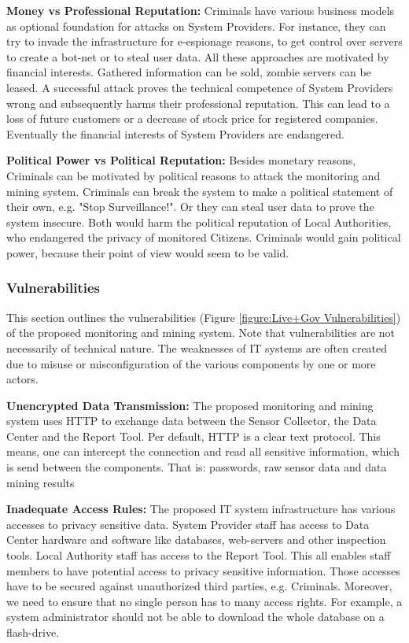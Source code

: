 \textbf{Money vs Professional Reputation:}
Criminals have various business models as optional foundation for attacks on System Providers.
For instance, they can try to invade the infrastructure for e-espionage reasons, to get control over servers to create a bot-net or to steal user data.
All these approaches are motivated by financial interests.
Gathered information can be sold, zombie servers can be leased.
A successful attack proves the technical competence of System Providers wrong and subsequently harms their professional reputation.
This can lead to a loss of future customers or a decrease of stock price for registered companies.
Eventually the financial interests of System Providers are endangered.


\textbf{Political Power vs Political Reputation:}
Besides monetary reasons, Criminals can be motivated by political reasons to attack the monitoring and mining system.
Criminals can break the system to make a political statement of their own, e.g. "Stop Surveillance!".
Or they can steal user data to prove the system insecure.
Both would harm the political reputation of Local Authorities, who endangered the privacy of monitored Citizens.
Criminals would gain political power, because their point of view would seem to be valid.




\subsubsection{Vulnerabilities}
This section outlines the vulnerabilities (Figure \ref{figure:Live+Gov Vulnerabilities}) of the proposed monitoring and mining system.
Note that vulnerabilities are not necessarily of technical nature.
The weaknesses of IT systems are often created due to misuse or misconfiguration of the various components by one or more actors.



\textbf{Unencrypted Data Transmission:}
The proposed monitoring and mining system uses HTTP to exchange data between the Sensor Collector, the Data Center and the Report Tool.
Per default, HTTP is a clear text protocol.
This means, one can intercept the connection and read all sensitive information, which is send between the components.
That is: passwords, raw sensor data and data mining results

\textbf{Inadequate Access Rules:}
The proposed IT system infrastructure has various accesses to privacy sensitive data.
System Provider staff has access to Data Center hardware and software like databases, web-servers and other inspection tools.
Local Authority staff has access to the Report Tool.
This all enables staff members to have potential access to privacy sensitive information.
Those accesses have to be secured against unauthorized third parties, e.g. Criminals.
Moreover, we need to ensure that no single person has to many access rights.
For example, a system administrator should not be able to download the whole database on a flash-drive.

